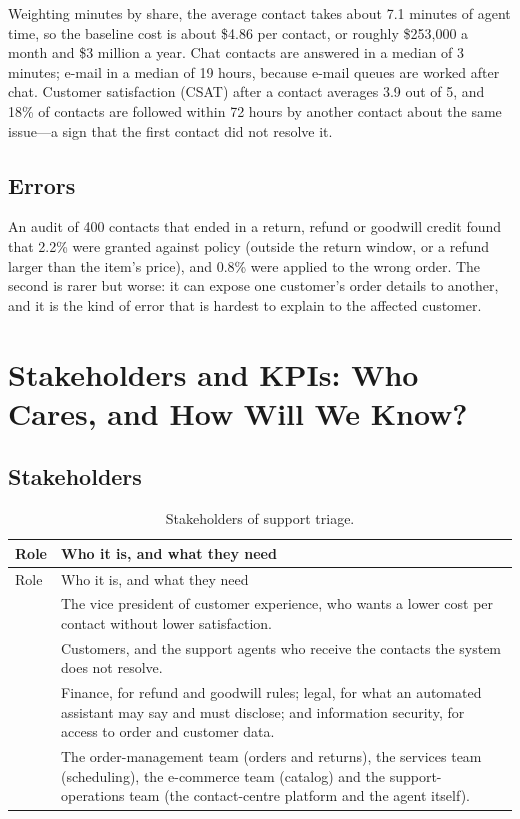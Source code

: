 Weighting minutes by share, the average contact takes about 7.1 minutes of agent time, so the baseline cost is about \$4.86 per contact, or roughly \$253{,}000 a month and \$3 million a year. Chat contacts are answered in a median of 3 minutes; e-mail in a median of 19 hours, because e-mail queues are worked after chat. Customer satisfaction (CSAT) after a contact averages 3.9 out of 5, and 18\% of contacts are followed within 72 hours by another contact about the same issue---a sign that the first contact did not resolve it.

\subsection{Errors}

An audit of 400 contacts that ended in a return, refund or goodwill credit found that 2.2\% were granted against policy (outside the return window, or a refund larger than the item's price), and 0.8\% were applied to the wrong order. The second is rarer but worse: it can expose one customer's order details to another, and it is the kind of error that is hardest to explain to the affected customer.

\section{Stakeholders and KPIs: Who Cares, and How Will We Know?}
\label{sec:support-kpis}

\subsection{Stakeholders}

\begingroup
\small
\begin{xltabular}{\textwidth}{@{}>{\raggedright\arraybackslash}p{2.0cm}>{\raggedright\arraybackslash}X@{}}
\caption{Stakeholders of support triage.}\label{tab:support-stakeholders}\\
\toprule
{} Role & Who it is, and what they need \\
\midrule
\endfirsthead
\toprule
{} Role & Who it is, and what they need \\
\midrule
\endhead
{} & The vice president of customer experience, who wants a lower cost per contact without lower satisfaction. \\
 & Customers, and the support agents who receive the contacts the system does not resolve. \\
 & Finance, for refund and goodwill rules; legal, for what an automated assistant may say and must disclose; and information security, for access to order and customer data. \\
 & The order-management team (orders and returns), the services team (scheduling), the e-commerce team (catalog) and the support-operations team (the contact-centre platform and the agent itself). \\
\bottomrule
\end{xltabular}
\endgroup

